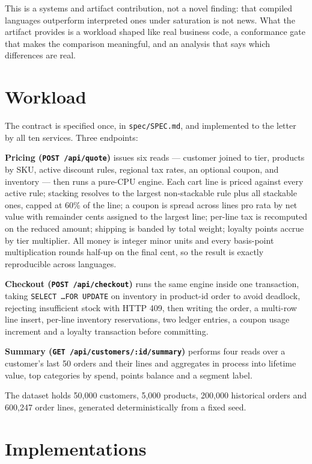 \documentclass[11pt,a4paper]{article}
\begin{document}
This is a systems and artifact contribution, not a novel finding: that compiled
languages outperform interpreted ones under saturation is not news. What the
artifact provides is a workload shaped like real business code, a conformance
gate that makes the comparison meaningful, and an analysis that says which
differences are real.

\section{Workload}

The contract is specified once, in \texttt{spec/SPEC.md}, and implemented to the
letter by all ten services. Three endpoints:

\textbf{Pricing (\texttt{POST /api/quote})} issues six reads --- customer joined
to tier, products by SKU, active discount rules, regional tax rates, an optional
coupon, and inventory --- then runs a pure-CPU engine. Each cart line is priced
against every active rule; stacking resolves to the largest non-stackable rule
plus all stackable ones, capped at 60\% of the line; a coupon is spread across
lines pro rata by net value with remainder cents assigned to the largest line;
per-line tax is recomputed on the reduced amount; shipping is banded by total
weight; loyalty points accrue by tier multiplier. All money is integer minor
units and every basis-point multiplication rounds half-up on the final cent, so
the result is exactly reproducible across languages.

\textbf{Checkout (\texttt{POST /api/checkout})} runs the same engine inside one
transaction, taking \texttt{SELECT \ldots FOR UPDATE} on inventory in
product-id order to avoid deadlock, rejecting insufficient stock with HTTP 409,
then writing the order, a multi-row line insert, per-line inventory
reservations, two ledger entries, a coupon usage increment and a loyalty
transaction before committing.

\textbf{Summary (\texttt{GET /api/customers/:id/summary})} performs four reads
over a customer's last 50 orders and their lines and aggregates in process into
lifetime value, top categories by spend, points balance and a segment label.

The dataset holds 50{,}000 customers, 5{,}000 products, 200{,}000 historical
orders and 600{,}247 order lines, generated deterministically from a fixed seed.

\section{Implementations}
\end{document}
